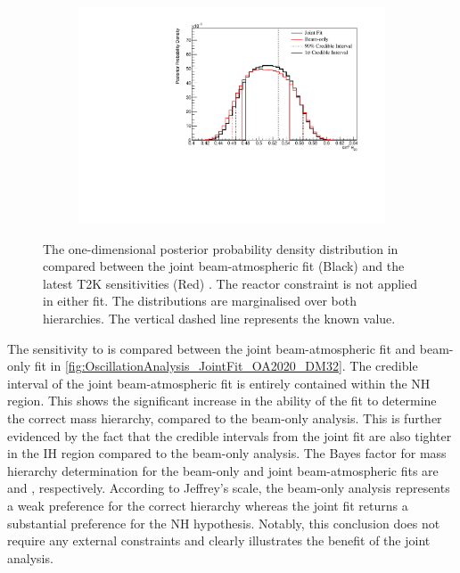 \begin{figure}[h]
  \begin{subfigure}[t]{0.91\textwidth}
    \includegraphics[width=\textwidth, trim={0mm 0mm 0mm 0mm}, clip,page=1]{Figures/OA/JointFit_OA2020_Comp/ContourComparison_1D_th23_BH_2_woRC_UnSmeared_CredibleInterval.pdf}
  \end{subfigure}
  \caption{The one-dimensional posterior probability density distribution in  compared between the joint beam-atmospheric fit (Black) and the latest T2K sensitivities (Red) \cite{Dunne2020-uf, t2k_tn_393}. The reactor constraint is not applied in either fit. The distributions are marginalised over both hierarchies. The vertical dashed line represents the known value.}
  \label{fig:OscillationAnalysis_JointFit_OA2020_TH23}
\end{figure}

\clearpage

The sensitivity to  is compared between the joint beam-atmospheric fit and beam-only fit in \autoref{fig:OscillationAnalysis_JointFit_OA2020_DM32}. The \quickmath{1\sigma} credible interval of the joint beam-atmospheric fit is entirely contained within the NH region. This shows the significant increase in the ability of the fit to determine the correct mass hierarchy, compared to the beam-only analysis. This is further evidenced by the fact that the  credible intervals from the joint fit are also tighter in the IH region compared to the beam-only analysis. The Bayes factor for mass hierarchy determination for the beam-only and joint beam-atmospheric fits are  and , respectively. According to Jeffrey's scale, the beam-only analysis represents a weak preference for the correct hierarchy whereas the joint fit returns a substantial preference for the NH hypothesis. Notably, this conclusion does not require any external constraints and clearly illustrates the benefit of the joint analysis.

